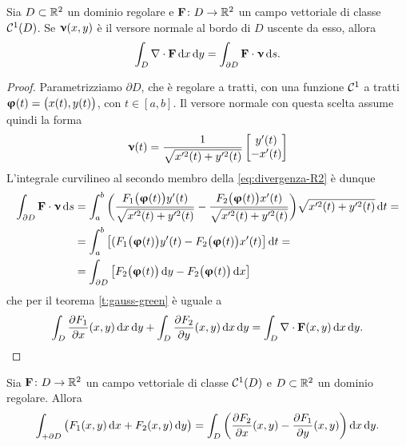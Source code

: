 \begin{teorema} \label{t:divergenza-R2}
	Sia $D\subset\mathbb{R}^2$ un dominio regolare e $\mathbf{F}\colon D\to\mathbb{R}^2$ un campo vettoriale di classe $\mathcal{C}^{{1}}(D)$.
	Se $\bm{\upnu}(x,y)$ è il versore normale al bordo di $D$ uscente da esso, allora
	\begin{equation}
		\int_D\nabla\cdot\mathbf{F}\,\textup{d} x\,\textup{d} y=\int_{\partial D}{\mathbf{F}}\cdot{\bm{\upnu}}\,\textup{d} s.
		\label{eq:divergenza-R2}
	\end{equation}
\end{teorema}
\begin{proof}
	Parametrizziamo $\partial D$, che è regolare a tratti, con una funzione $\mathcal{C}^{{1}}$ a tratti $\bm{\upvarphi}(t)=\big(x(t),y(t)\big)$, con $t\in[a,b]$.
	Il versore normale con questa scelta assume quindi la forma
	\begin{equation*}
		\bm{\upnu}(t)=\frac1{\sqrt{x'^2(t)+y'^2(t)}}
		\begin{bmatrix}
			y'(t)\\-x'(t)
		\end{bmatrix}
	\end{equation*}
	L'integrale curvilineo al secondo membro della \eqref{eq:divergenza-R2} è dunque
	\begin{equation}
		\begin{split}
			\int_{\partial D}{\mathbf{F}}\cdot{\bm{\upnu}}\,\textup{d} s&=\int_a^b\bigg(\frac{F_1\big(\bm{\upvarphi}(t)\big)y'(t)}{\sqrt{x'^2(t)+y'^2(t)}}-\frac{F_2\big(\bm{\upvarphi}(t)\big)x'(t)}{\sqrt{x'^2(t)+y'^2(t)}}\bigg)\sqrt{x'^2(t)+y'^2(t)}\,\textup{d} t=\\
			&=\int_a^b\big[(F_1\big(\bm{\upvarphi}(t)\big)y'(t)-F_2\big(\bm{\upvarphi}(t)\big)x'(t)\big]\,\textup{d} t=\\
			&=\int_{\partial D}\big[F_2\big(\bm{\upvarphi}(t)\big)\,\textup{d} y-F_2\big(\bm{\upvarphi}(t)\big)\,\textup{d} x\big]
		\end{split}
	\end{equation}
	che per il teorema \ref{t:gauss-green} è uguale a
	\begin{equation}
		\int_D\frac{\partial {F_1}}{\partial {x}}(x,y)\,\textup{d} x\,\textup{d} y+\int_D\frac{\partial {F_2}}{\partial {y}}(x,y)\,\textup{d} x\,\textup{d} y=\int_D\nabla\cdot\mathbf{F}(x,y)\,\textup{d} x\,\textup{d} y.\qedhere
	\end{equation}
\end{proof}
\begin{teorema} \label{t:rotore-R2}
	Sia $\mathbf{F}\colon D\to\mathbb{R}^2$ un campo vettoriale di classe $\mathcal{C}^{{1}}(D)$ e $D\subset\mathbb{R}^2$ un dominio regolare.
	Allora
	\begin{equation}
		\int_{+\partial D}\big(F_1(x,y)\,\textup{d} x+F_2(x,y)\,\textup{d} y\big)=\int_D\bigg(\frac{\partial {F_2}}{\partial {x}}(x,y)-\frac{\partial {F_1}}{\partial {y}}(x,y)\bigg)\,\textup{d} x\,\textup{d} y.
		\label{eq:rotore-R2}
	\end{equation}
\end{teorema}
